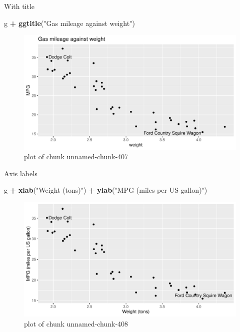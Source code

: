 \documentclass[
  ignorenonframetext,
]{beamer}
\newenvironment{Shaded}{\begin{snugshade}}{\end{snugshade}}
\newcommand{\KeywordTok}[1]{\textcolor[rgb]{0.13,0.29,0.53}{\textbf{#1}}}
\newcommand{\NormalTok}[1]{#1}
\newcommand{\OperatorTok}[1]{\textcolor[rgb]{0.81,0.36,0.00}{\textbf{#1}}}
\newcommand{\StringTok}[1]{\textcolor[rgb]{0.31,0.60,0.02}{#1}}
\begin{document}
\begin{frame}[fragile]{With title}
\protect\hypertarget{with-title}{}

\begin{Shaded}
\begin{Highlighting}[]
\NormalTok{g }\OperatorTok{+}\StringTok{ }\KeywordTok{ggtitle}\NormalTok{(}\StringTok{"Gas mileage against weight"}\NormalTok{)}
\end{Highlighting}
\end{Shaded}

\begin{figure}
\centering
\includegraphics{figure/unnamed-chunk-407-1.pdf}
\caption{plot of chunk unnamed-chunk-407}
\end{figure}

\end{frame}

\begin{frame}[fragile]{Axis labels}
\protect\hypertarget{axis-labels}{}

\begin{Shaded}
\begin{Highlighting}[]
\NormalTok{g }\OperatorTok{+}\StringTok{ }\KeywordTok{xlab}\NormalTok{(}\StringTok{"Weight (tons)"}\NormalTok{) }\OperatorTok{+}\StringTok{ }\KeywordTok{ylab}\NormalTok{(}\StringTok{"MPG (miles per US gallon)"}\NormalTok{)}
\end{Highlighting}
\end{Shaded}

\begin{figure}
\centering
\includegraphics{figure/unnamed-chunk-408-1.pdf}
\caption{plot of chunk unnamed-chunk-408}
\end{figure}

\end{frame}
\end{document}
